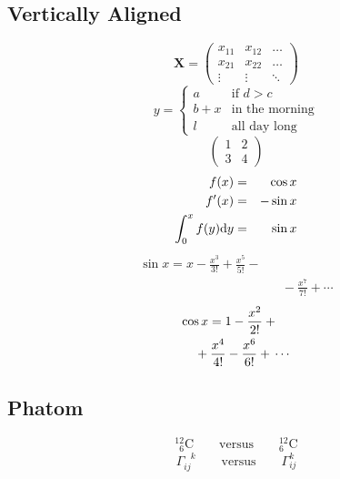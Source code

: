 \documentclass[a4paper,11pt]{article}
\begin{document}
\subsection{Vertically Aligned}
\begin{displaymath}
    \mathbf{X} =
    \left(
        \begin{array}{ccc}
            x_{11} & x_{12} & \ldots \\
            x_{21} & x_{22} & \ldots \\
            \vdots & \vdots & \ddots
        \end{array}
    \right)
\end{displaymath}
\begin{displaymath}
    y = \left\{
        \begin{array}{ll}
            a   &   \textrm{if $d > c$}\\
            b+x &   \textrm{in the morning} \\
            l   &   \textrm{all day long}
        \end{array}
        \right.
\end{displaymath}
\begin{displaymath}
    \left(
        \begin{array}{c|c}
            1 & 2 \\
            \hline
            3 & 4
        \end{array}
    \right)
\end{displaymath}
\begin{eqnarray}
    f(x)    &=& \cos x \\
    f'(x)   &=& -\sin x\\
    \int_{0}^{x} f(y)\mathrm{d} y &=& \sin x
\end{eqnarray}
{\setlength\arraycolsep{2pt}
\begin{eqnarray}
    \sin x = x - \frac{x^3}{3!} + \frac{x^5}{5!}-{}
    \nonumber \\
    & & {}-\frac{x^7}{7!}+{}\cdots
\end{eqnarray}
}
\begin{eqnarray}
    \lefteqn{
        \cos x =1-\frac{x^2}{2!}+{}}
        \nonumber\\
        & &{}+\frac{x^4}{4!}-\frac{x^6}{6!}+{}\cdots
\end{eqnarray}

\subsection{Phatom}
\begin{displaymath}
    {}^{12}_{\phantom{1}6}\textrm{C}
    \qquad \textrm{versus}  \qquad
    {}^{12}_{6}\textrm{C}
\end{displaymath}
\begin{displaymath}
    \Gamma_{ij}^{\phantom{ij}k}
    \qquad \textrm{versus} \qquad
    \Gamma_{ij}^k
\end{displaymath}
\end{document}
